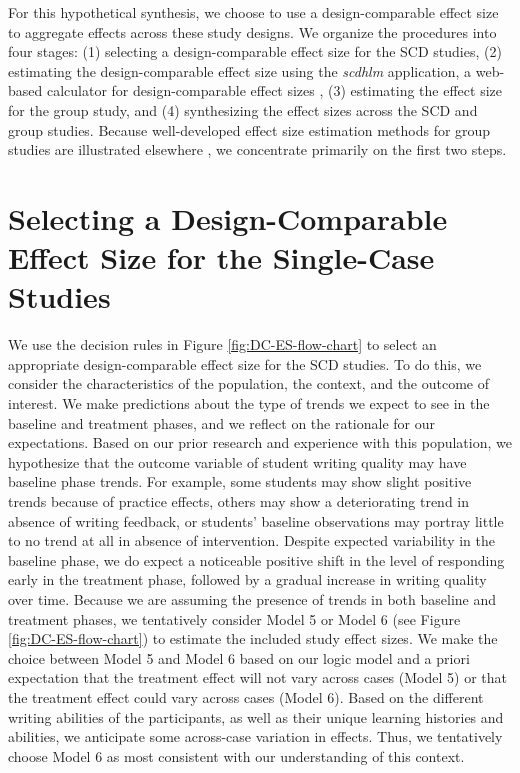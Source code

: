 \documentclass[
]{book}
\begin{document}
For this hypothetical synthesis, we choose to use a design-comparable effect size to aggregate effects across these study designs. We organize the procedures into four stages: (1) selecting a design-comparable effect size for the SCD studies, (2) estimating the design-comparable effect size using the \emph{scdhlm} application, a web-based calculator for design-comparable effect sizes \citep{pustejovsky2021scdhlm}, (3) estimating the effect size for the group study, and (4) synthesizing the effect sizes across the SCD and group studies. Because well-developed effect size estimation methods for group studies are illustrated elsewhere \citep{borenstein2021introduction, cooper2019handbook}, we concentrate primarily on the first two steps.

\hypertarget{selecting-a-design-comparable-effect-size-for-the-single-case-studies-2}{%
\section{Selecting a Design-Comparable Effect Size for the Single-Case Studies}\label{selecting-a-design-comparable-effect-size-for-the-single-case-studies-2}}

We use the decision rules in Figure \ref{fig:DC-ES-flow-chart} to select an appropriate design-comparable effect size for the SCD studies. To do this, we consider the characteristics of the population, the context, and the outcome of interest. We make predictions about the type of trends we expect to see in the baseline and treatment phases, and we reflect on the rationale for our expectations. Based on our prior research and experience with this population, we hypothesize that the outcome variable of student writing quality may have baseline phase trends. For example, some students may show slight positive trends because of practice effects, others may show a deteriorating trend in absence of writing feedback, or students' baseline observations may portray little to no trend at all in absence of intervention. Despite expected variability in the baseline phase, we do expect a noticeable positive shift in the level of responding early in the treatment phase, followed by a gradual increase in writing quality over time. Because we are assuming the presence of trends in both baseline and treatment phases, we tentatively consider Model 5 or Model 6 (see Figure \ref{fig:DC-ES-flow-chart}) to estimate the included study effect sizes. We make the choice between Model 5 and Model 6 based on our logic model and a priori expectation that the treatment effect will not vary across cases (Model 5) or that the treatment effect could vary across cases (Model 6). Based on the different writing abilities of the participants, as well as their unique learning histories and abilities, we anticipate some across-case variation in effects. Thus, we tentatively choose Model 6 as most consistent with our understanding of this context.
\end{document}
